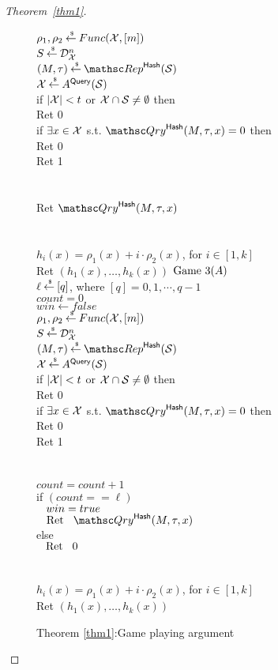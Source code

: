 \begin{proof}[Theorem~\ref{thm1}]
\begin{figure}
{{$\rho_1,\rho_2 {\:\stackrel{{\scriptscriptstyle \hspace{0.2em}\$}} {\leftarrow}\:} Func({\cal X},[m])$\\
$S {\:\stackrel{{\scriptscriptstyle \hspace{0.2em}\$}} {\leftarrow}\:} \mathcal{D}_{{\cal X}}^{n}$\\
$(M,\tau) \getsr \Rep^{\HashOracle}(\calS)$\\
${\cal X} {\:\stackrel{{\scriptscriptstyle \hspace{0.2em}\$}} {\leftarrow}\:} A^{\mathsf{Query}}({\cal S})$\\
if $|{\cal X}| < t$ or ${\cal X} \cap {\cal S} \neq \emptyset$ then \\
\nudge Ret 0\\
if $\exists x \in {\cal X}$ s.t. $\Qry^{\HashOracle}(M,\tau,x)=0$ then\\
\nudge Ret 0\\
Ret 1\\\\
%
\\
Ret $\Qry^{\HashOracle}(M,\tau,x)$\\\\
%
\\
$h_i(x) = \rho_1(x)+i \cdot \rho_2(x)$, for $i\in[1,k]$\\
Ret $\left(h_1(x),\ldots,h_k(x)\right)$
}
{
\underline{$\text{Game 3}(A)$}\\
$\ell {\:\stackrel{{\scriptscriptstyle \hspace{0.2em}\$}} {\leftarrow}\:} [q]$, where $[q] = {0,1, \cdots, q-1}$\\
$count = 0$ \\%
$win \gets false$\\
$\rho_1,\rho_2 {\:\stackrel{{\scriptscriptstyle \hspace{0.2em}\$}} {\leftarrow}\:} Func({\cal X},[m])$\\
$S {\:\stackrel{{\scriptscriptstyle \hspace{0.2em}\$}} {\leftarrow}\:} \mathcal{D}_{{\cal X}}^{n}$\\
$(M,\tau) \getsr \Rep^{\HashOracle}(\calS)$\\
${\cal X} {\:\stackrel{{\scriptscriptstyle \hspace{0.2em}\$}} {\leftarrow}\:} A^{\mathsf{Query}}({\cal S})$\\
if $|{\cal X}| < t$ or ${\cal X} \cap {\cal S} \neq \emptyset$ then \\
\nudge Ret 0\\
if $\exists x \in {\cal X}$ s.t. $\Qry^{\HashOracle}(M,\tau,x)=0$ then\\
\nudge Ret 0\\
Ret 1\\\\
%
\\
$count=count +1$\\
if $(count == \ell)$\\
$\hspace*{2ex} win = true$\\
$\nudge \mathrm{Ret} \nudge \Qry^{\HashOracle}(M,\tau,x)$\\
else \\
$\hspace*{2ex} \mathrm{Ret}\hspace*{2ex} 0$\\\\
%
\\
$h_i(x) = \rho_1(x)+i \cdot \rho_2(x)$, for $i\in[1,k]$\\
Ret $\left(h_1(x),\ldots,h_k(x)\right)$
}
}
\caption{Theorem \ref{thm1}:Game playing argument}\label{fig:Game}
\end{figure}


\end{proof}

